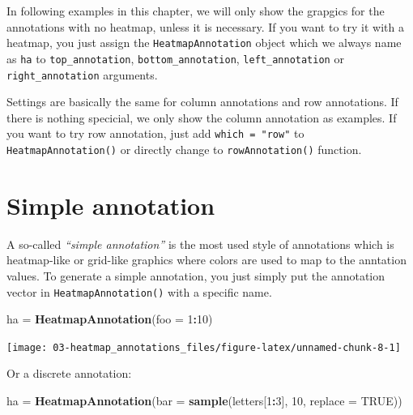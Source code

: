 \documentclass[]{book}
\newenvironment{Shaded}{\begin{snugshade}}{\end{snugshade}}
\newcommand{\KeywordTok}[1]{\textcolor[rgb]{0.13,0.29,0.53}{\textbf{#1}}}
\newcommand{\DataTypeTok}[1]{\textcolor[rgb]{0.13,0.29,0.53}{#1}}
\newcommand{\DecValTok}[1]{\textcolor[rgb]{0.00,0.00,0.81}{#1}}
\newcommand{\StringTok}[1]{\textcolor[rgb]{0.31,0.60,0.02}{#1}}
\newcommand{\OtherTok}[1]{\textcolor[rgb]{0.56,0.35,0.01}{#1}}
\newcommand{\OperatorTok}[1]{\textcolor[rgb]{0.81,0.36,0.00}{\textbf{#1}}}
\newcommand{\NormalTok}[1]{#1}
\theoremstyle{definition}
\theoremstyle{definition}
\theoremstyle{definition}
\theoremstyle{remark}
\begin{document}
In following examples in this chapter, we will only show the grapgics
for the annotations with no heatmap, unless it is necessary. If you want
to try it with a heatmap, you just assign the \texttt{HeatmapAnnotation}
object which we always name as \texttt{ha} to \texttt{top\_annotation},
\texttt{bottom\_annotation}, \texttt{left\_annotation} or
\texttt{right\_annotation} arguments.

Settings are basically the same for column annotations and row
annotations. If there is nothing specicial, we only show the column
annotation as examples. If you want to try row annotation, just add
\texttt{which\ =\ "row"} to \texttt{HeatmapAnnotation()} or directly
change to \texttt{rowAnnotation()} function.

\section{Simple annotation}\label{simple-annotation}

A so-called \emph{``simple annotation''} is the most used style of
annotations which is heatmap-like or grid-like graphics where colors are
used to map to the anntation values. To generate a simple annotation,
you just simply put the annotation vector in
\texttt{HeatmapAnnotation()} with a specific name.

\begin{Shaded}
\begin{Highlighting}[]
\NormalTok{ha =}\StringTok{ }\KeywordTok{HeatmapAnnotation}\NormalTok{(}\DataTypeTok{foo =} \DecValTok{1}\OperatorTok{:}\DecValTok{10}\NormalTok{)}
\end{Highlighting}
\end{Shaded}

\begin{center}\texttt{[image: 03-heatmap\_annotations\_files/figure-latex/unnamed-chunk-8-1]} \end{center}

Or a discrete annotation:

\begin{Shaded}
\begin{Highlighting}[]
\NormalTok{ha =}\StringTok{ }\KeywordTok{HeatmapAnnotation}\NormalTok{(}\DataTypeTok{bar =} \KeywordTok{sample}\NormalTok{(letters[}\DecValTok{1}\OperatorTok{:}\DecValTok{3}\NormalTok{], }\DecValTok{10}\NormalTok{, }\DataTypeTok{replace =} \OtherTok{TRUE}\NormalTok{))}
\end{Highlighting}
\end{Shaded}
\end{document}
